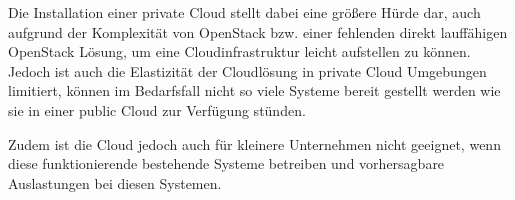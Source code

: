 Die Installation einer private Cloud stellt dabei eine größere Hürde dar, auch aufgrund der Komplexität von OpenStack  bzw. einer fehlenden direkt lauffähigen OpenStack Lösung, um eine Cloudinfrastruktur leicht aufstellen zu können. Jedoch ist auch die Elastizität der Cloudlösung in private Cloud Umgebungen limitiert, können im Bedarfsfall nicht so viele Systeme bereit gestellt werden wie sie in einer public Cloud zur Verfügung stünden.

Zudem ist die Cloud jedoch auch für kleinere Unternehmen nicht geeignet, wenn diese funktionierende bestehende Systeme betreiben und vorhersagbare Auslastungen bei diesen Systemen.